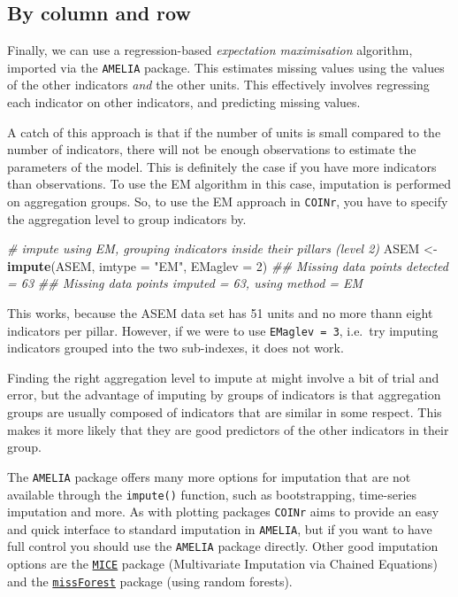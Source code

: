 \documentclass[
]{book}
\newenvironment{Shaded}{\begin{snugshade}}{\end{snugshade}}
\newcommand{\CommentTok}[1]{\textcolor[rgb]{0.56,0.35,0.01}{\textit{#1}}}
\newcommand{\DataTypeTok}[1]{\textcolor[rgb]{0.13,0.29,0.53}{#1}}
\newcommand{\DecValTok}[1]{\textcolor[rgb]{0.00,0.00,0.81}{#1}}
\newcommand{\KeywordTok}[1]{\textcolor[rgb]{0.13,0.29,0.53}{\textbf{#1}}}
\newcommand{\NormalTok}[1]{#1}
\newcommand{\StringTok}[1]{\textcolor[rgb]{0.31,0.60,0.02}{#1}}
\begin{document}
\hypertarget{by-column-and-row}{%
\subsection{By column and row}\label{by-column-and-row}}

Finally, we can use a regression-based \emph{expectation maximisation} algorithm, imported via the \texttt{AMELIA} package. This estimates missing values using the values of the other indicators \emph{and} the other units. This effectively involves regressing each indicator on other indicators, and predicting missing values.

A catch of this approach is that if the number of units is small compared to the number of indicators, there will not be enough observations to estimate the parameters of the model. This is definitely the case if you have more indicators than observations. To use the EM algorithm in this case, imputation is performed on aggregation groups. So, to use the EM approach in \texttt{COINr}, you have to specify the aggregation level to group indicators by.

\begin{Shaded}
\begin{Highlighting}[]
\CommentTok{# impute using EM, grouping indicators inside their pillars (level 2)}
\NormalTok{ASEM <-}\StringTok{ }\KeywordTok{impute}\NormalTok{(ASEM, }\DataTypeTok{imtype =} \StringTok{"EM"}\NormalTok{, }\DataTypeTok{EMaglev =} \DecValTok{2}\NormalTok{)}
\CommentTok{## Missing data points detected = 63}
\CommentTok{## Missing data points imputed = 63, using method = EM}
\end{Highlighting}
\end{Shaded}

This works, because the ASEM data set has 51 units and no more thann eight indicators per pillar. However, if we were to use \texttt{EMaglev\ =\ 3}, i.e.~try imputing indicators grouped into the two sub-indexes, it does not work.

Finding the right aggregation level to impute at might involve a bit of trial and error, but the advantage of imputing by groups of indicators is that aggregation groups are usually composed of indicators that are similar in some respect. This makes it more likely that they are good predictors of the other indicators in their group.

The \texttt{AMELIA} package offers many more options for imputation that are not available through the \texttt{impute()} function, such as bootstrapping, time-series imputation and more. As with plotting packages \texttt{COINr} aims to provide an easy and quick interface to standard imputation in \texttt{AMELIA}, but if you want to have full control you should use the \texttt{AMELIA} package directly. Other good imputation options are the \href{https://cran.r-project.org/web/packages/mice/index.html}{\texttt{MICE}} package (Multivariate Imputation via Chained Equations) and the \href{https://cran.rstudio.com/web/packages/missForest/index.html}{\texttt{missForest}} package (using random forests).
\end{document}
